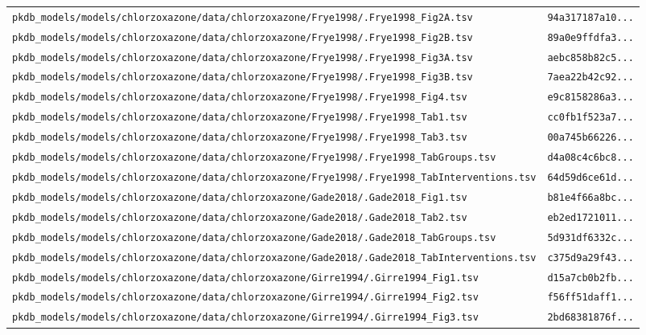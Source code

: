 \begin{longtable}{ll}
\texttt{pkdb\_models/models/chlorzoxazone/data/chlorzoxazone/Frye1998/.Frye1998\_Fig2A.tsv} & \texttt{94a317187a10...} \\
\texttt{pkdb\_models/models/chlorzoxazone/data/chlorzoxazone/Frye1998/.Frye1998\_Fig2B.tsv} & \texttt{89a0e9ffdfa3...} \\
\texttt{pkdb\_models/models/chlorzoxazone/data/chlorzoxazone/Frye1998/.Frye1998\_Fig3A.tsv} & \texttt{aebc858b82c5...} \\
\texttt{pkdb\_models/models/chlorzoxazone/data/chlorzoxazone/Frye1998/.Frye1998\_Fig3B.tsv} & \texttt{7aea22b42c92...} \\
\texttt{pkdb\_models/models/chlorzoxazone/data/chlorzoxazone/Frye1998/.Frye1998\_Fig4.tsv} & \texttt{e9c8158286a3...} \\
\texttt{pkdb\_models/models/chlorzoxazone/data/chlorzoxazone/Frye1998/.Frye1998\_Tab1.tsv} & \texttt{cc0fb1f523a7...} \\
\texttt{pkdb\_models/models/chlorzoxazone/data/chlorzoxazone/Frye1998/.Frye1998\_Tab3.tsv} & \texttt{00a745b66226...} \\
\texttt{pkdb\_models/models/chlorzoxazone/data/chlorzoxazone/Frye1998/.Frye1998\_TabGroups.tsv} & \texttt{d4a08c4c6bc8...} \\
\texttt{pkdb\_models/models/chlorzoxazone/data/chlorzoxazone/Frye1998/.Frye1998\_TabInterventions.tsv} & \texttt{64d59d6ce61d...} \\
\texttt{pkdb\_models/models/chlorzoxazone/data/chlorzoxazone/Gade2018/.Gade2018\_Fig1.tsv} & \texttt{b81e4f66a8bc...} \\
\texttt{pkdb\_models/models/chlorzoxazone/data/chlorzoxazone/Gade2018/.Gade2018\_Tab2.tsv} & \texttt{eb2ed1721011...} \\
\texttt{pkdb\_models/models/chlorzoxazone/data/chlorzoxazone/Gade2018/.Gade2018\_TabGroups.tsv} & \texttt{5d931df6332c...} \\
\texttt{pkdb\_models/models/chlorzoxazone/data/chlorzoxazone/Gade2018/.Gade2018\_TabInterventions.tsv} & \texttt{c375d9a29f43...} \\
\texttt{pkdb\_models/models/chlorzoxazone/data/chlorzoxazone/Girre1994/.Girre1994\_Fig1.tsv} & \texttt{d15a7cb0b2fb...} \\
\texttt{pkdb\_models/models/chlorzoxazone/data/chlorzoxazone/Girre1994/.Girre1994\_Fig2.tsv} & \texttt{f56ff51daff1...} \\
\texttt{pkdb\_models/models/chlorzoxazone/data/chlorzoxazone/Girre1994/.Girre1994\_Fig3.tsv} & \texttt{2bd68381876f...} \\

\end{longtable}
